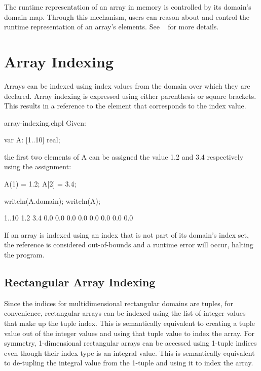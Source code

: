The runtime representation of an array in memory is controlled by its
domain's domain map.  Through this mechanism, users can reason about
and control the runtime representation of an array's elements.  See
~ for more details.


\section{Array Indexing}
\label{Array_Indexing}

Arrays can be indexed using index values from the domain over which
they are declared.  Array indexing is expressed using either
parenthesis or square brackets.  This results in a reference to the
element that corresponds to the index value.


\begin{chapelexample}{array-indexing.chpl}
Given:
\begin{chapel}
var A: [1..10] real;
\end{chapel}
the first two elements of A can be assigned the value 1.2 and 3.4
respectively using the assignment:
\begin{chapel}
A(1) = 1.2;
A[2] = 3.4;
\end{chapel}
\begin{chapelpost}
writeln(A.domain);
writeln(A);
\end{chapelpost}
\begin{chapeloutput}
{1..10}
1.2 3.4 0.0 0.0 0.0 0.0 0.0 0.0 0.0 0.0
\end{chapeloutput}
\end{chapelexample}

If an array is indexed using an index that is not part of its domain's
index set, the reference is considered out-of-bounds and a runtime
error will occur, halting the program.


\subsection{Rectangular Array Indexing}
\label{Rectangular_Array_Indexing}

Since the indices for multidimensional rectangular domains are tuples,
for convenience, rectangular arrays can be indexed using the list of
integer values that make up the tuple index.  This is semantically
equivalent to creating a tuple value out of the integer values and
using that tuple value to index the array.  For symmetry,
1-dimensional rectangular arrays can be accessed using 1-tuple indices
even though their index type is an integral value.  This is
semantically equivalent to de-tupling the integral value from the
1-tuple and using it to index the array.

